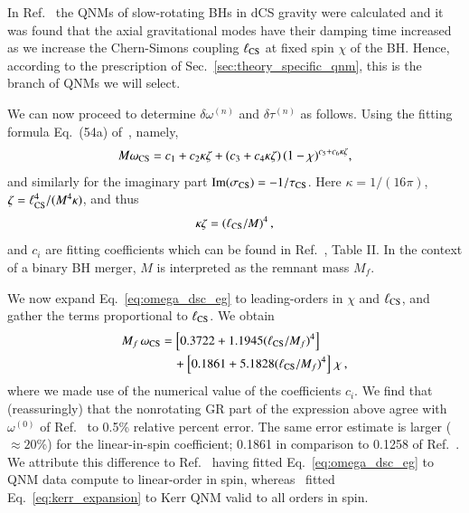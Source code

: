 \documentclass[twocolumn,
               prd,
               aps,
               superscriptaddress,
               tightenlines,
               nofootinbib,
               eqsecnum,
               amsfonts,
               amsmath,
               longbibliography]{revtex4-1}
\newcommand{\Mf}{M_f}
\begin{document}
%
In Ref.~\cite{Wagle:2021tam} the QNMs of slow-rotating BHs in dCS gravity were calculated
and it was found that the axial gravitational modes have their damping time increased as we
increase the Chern-Simons coupling $\ell_{\rm CS}$ at fixed spin $\chi$ of the BH.
%
Hence, according to the prescription of Sec.~\ref{sec:theory_specific_qnm}, this is the branch of QNMs we will select.

We can now proceed to determine $\delta\omega^{(n)}$ and $\delta\tau^{(n)}$ as follows.
%
Using the fitting formula Eq.~(54a) of~\cite{Wagle:2021tam}, namely,
%
\begin{equation}
    M \omega_{\rm CS} = c_{1} + c_{2} \kappa \zeta + (c_{3} + c_{4} \kappa \zeta) \, (1 - \chi)^{c_{5} + c_{6} \kappa \zeta},
    \label{eq:omega_dsc_eg}
\end{equation}
%
and similarly for the imaginary part ${\rm Im}(\sigma_{\rm CS}) =  - 1 / \tau_{\rm CS}$.
%
Here $\kappa = 1/(16 \pi)$, $\zeta = \ell_{\rm CS}^{4} / (M^4 \kappa)$, and thus
%
\begin{equation}
\kappa \zeta = (\ell_{\rm CS} / M)^4 \,,
\end{equation}
%
and $c_{i}$ are fitting coefficients which can be found in Ref.~\cite{Wagle:2021tam}, Table II.
%
In the context of a binary BH merger, $M$ is interpreted as the remnant mass $\Mf$.

We now expand Eq.~\eqref{eq:omega_dsc_eg} to leading-orders in $\chi$ and $\ell_{\rm CS}$, and
gather the terms proportional to $\ell_{\rm CS}$.
%
We obtain
%
\begin{align}
    \Mf \, \omega_{\rm CS} &=
    \left[ 0.3722 + 1.1945 (\ell_{\rm CS} / \Mf)^4 \right]
    \nonumber \\
    &\quad + \left[0.1861 + 5.1828 (\ell_{\rm CS} / \Mf)^4 \right] \, \chi\,,
    \label{eq:omega_dcs_interm}
\end{align}
%
where we made use of the numerical value of the coefficients $c_{i}$.
%
We find that (reassuringly) that the nonrotating GR part of the expression above agree with $\omega^{(0)}$ of Ref.~\cite{Maselli:2019mjd}
to 0.5\% relative percent error. The same error estimate is larger ($\approx 20$\%) for the linear-in-spin coefficient;
0.1861 in comparison to 0.1258 of Ref.~\cite{Maselli:2019mjd}.
%
We attribute this difference to Ref.~\cite{Wagle:2021tam} having fitted Eq.~\eqref{eq:omega_dsc_eg} to QNM data compute to linear-order in spin, whereas~\cite{Maselli:2019mjd}
fitted Eq.~\eqref{eq:kerr_expansion} to Kerr QNM valid to all orders in spin.
\end{document}
